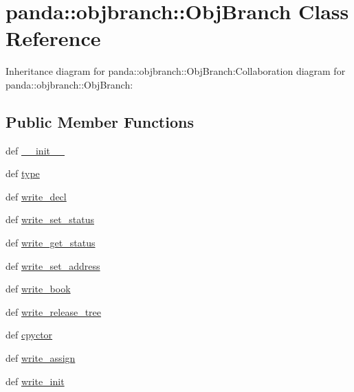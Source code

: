 \hypertarget{classpanda_1_1objbranch_1_1ObjBranch}{
\section{panda::objbranch::ObjBranch Class Reference}
\label{classpanda_1_1objbranch_1_1ObjBranch}
}
Inheritance diagram for panda::objbranch::ObjBranch:Collaboration diagram for panda::objbranch::ObjBranch:\subsection*{Public Member Functions}
\begin{DoxyCompactItemize}
\item 
def \hyperlink{classpanda_1_1objbranch_1_1ObjBranch_a09fa7f1568418614396e84499be09489}{\_\-\_\-init\_\-\_\-}
\item 
def \hyperlink{classpanda_1_1objbranch_1_1ObjBranch_a206aa6a416f02b90d965654e2c0b6a59}{type}
\item 
def \hyperlink{classpanda_1_1objbranch_1_1ObjBranch_a66ec1f2653f722ea1856e3a6006beaf6}{write\_\-decl}
\item 
def \hyperlink{classpanda_1_1objbranch_1_1ObjBranch_af6f04622759dddc4e24eb980f0140b29}{write\_\-set\_\-status}
\item 
def \hyperlink{classpanda_1_1objbranch_1_1ObjBranch_a511614992f5da23c941b7f8f66cc77c8}{write\_\-get\_\-status}
\item 
def \hyperlink{classpanda_1_1objbranch_1_1ObjBranch_a79954c7cd8a0afb7cc3b24c493487956}{write\_\-set\_\-address}
\item 
def \hyperlink{classpanda_1_1objbranch_1_1ObjBranch_a8c3941176978f99e6aeebbdc7ad6a1c6}{write\_\-book}
\item 
def \hyperlink{classpanda_1_1objbranch_1_1ObjBranch_a0549e3b6bc15d28913cebac1deebbe47}{write\_\-release\_\-tree}
\item 
def \hyperlink{classpanda_1_1objbranch_1_1ObjBranch_a89087bd43f650e6270c06a412022d617}{cpyctor}
\item 
def \hyperlink{classpanda_1_1objbranch_1_1ObjBranch_a1a98e6388842d910aadfd1eb89a1bec5}{write\_\-assign}
\item 
def \hyperlink{classpanda_1_1objbranch_1_1ObjBranch_aa7d9351e87ed432337bb2fbd807dc857}{write\_\-init}
\end{DoxyCompactItemize}
